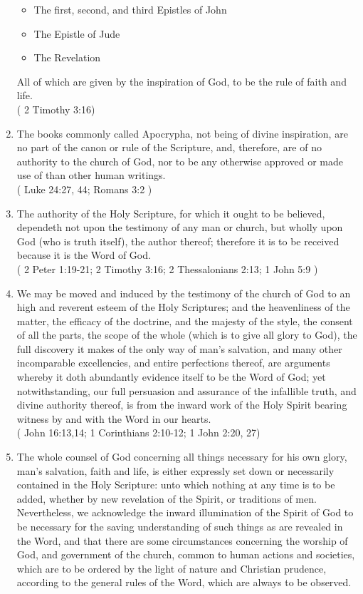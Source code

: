 \documentclass[12pt,a4paper]{book}
\begin{document}
\begin{enumerate}
\begin{itemize}
\item The first, second, and third Epistles of John
\item The Epistle of Jude
\item The Revelation
\end{itemize}
All of which are given by the inspiration of God, to be the rule of faith and life.\\
( 2 Timothy 3:16)
\item
\label{ch-Scr-3}
The books commonly called Apocrypha, not being of divine inspiration, are no part of the canon or rule of the Scripture, and, therefore, are of no authority to the church of God, nor to be any otherwise approved or made use of than other human writings.\\
( Luke 24:27, 44; Romans 3:2 )
\item
\label{ch-Scr-4}
The authority of the Holy Scripture, for which it ought to be believed, dependeth not upon the testimony of any man or church, but wholly upon God (who is truth itself), the author thereof; therefore it is to be received because it is the Word of God.\\
( 2 Peter 1:19-21; 2 Timothy 3:16; 2 Thessalonians 2:13; 1 John 5:9 )
\item
\label{ch-Scr-5}
We may be moved and induced by the testimony of the church of God to an high and reverent esteem of the Holy Scriptures; and the heavenliness of the matter, the efficacy of the doctrine, and the majesty of the style, the consent of all the parts, the scope of the whole (which is to give all glory to God), the full discovery it makes of the only way of man's salvation, and many other incomparable excellencies, and entire perfections thereof, are arguments whereby it doth abundantly evidence itself to be the Word of God; yet notwithstanding, our full persuasion and assurance of the infallible truth, and divine authority thereof, is from the inward work of the Holy Spirit bearing witness by and with the Word in our hearts.\\
( John 16:13,14; 1 Corinthians 2:10-12; 1 John 2:20, 27)
\item
\label{ch-Scr-6}
The whole counsel of God concerning all things necessary for his own glory, man's salvation, faith and life, is either expressly set down or necessarily contained in the Holy Scripture: unto which nothing at any time is to be added, whether by new revelation of the Spirit, or traditions of men. Nevertheless, we acknowledge the inward illumination of the Spirit of God to be necessary for the saving understanding of such things as are revealed in the Word, and that there are some circumstances concerning the worship of God, and government of the church, common to human actions and societies, which are to be ordered by the light of nature and Christian prudence, according to the general rules of the Word, which are always to be observed.\\

\end{enumerate}
\end{document}
